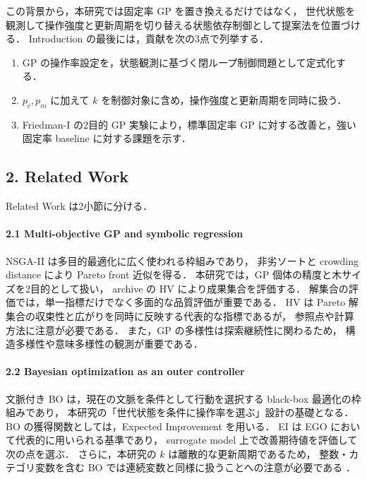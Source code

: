 \documentclass[a4paper,10pt,twocolumn]{ltjsarticle}
\newcommand{\HV}{\mathrm{HV}}
\newcommand{\pc}{p_c}
\newcommand{\pmut}{p_m}
\begin{document}
この背景から，本研究では固定率 GP を置き換えるだけではなく，
世代状態を観測して操作強度と更新周期を切り替える状態依存制御として提案法を位置づける．
Introduction の最後には，貢献を次の3点で列挙する．

\begin{enumerate}
  \item GP の操作率設定を，状態観測に基づく閉ループ制御問題として定式化する．
  \item \(\pc,\pmut\) に加えて \(k\) を制御対象に含め，操作強度と更新周期を同時に扱う．
  \item Friedman-I の2目的 GP 実験により，標準固定率 GP に対する改善と，強い固定率 baseline に対する課題を示す．
\end{enumerate}

\subsection{2. Related Work}

Related Work は2小節に分ける．

\paragraph{2.1 Multi-objective GP and symbolic regression}
NSGA-II は多目的最適化に広く使われる枠組みであり，
非劣ソートと crowding distance により Pareto front 近似を得る\cite{verma2021}．
本研究では，GP 個体の精度と木サイズを2目的として扱い，
archive の \(\HV\) により成果集合を評価する．
解集合の評価では，単一指標だけでなく多面的な品質評価が重要である\cite{li2019}．
\(\HV\) は Pareto 解集合の収束性と広がりを同時に反映する代表的な指標であるが，
参照点や計算方法に注意が必要である\cite{guerreiro2021}．
また，GP の多様性は探索継続性に関わるため，
構造多様性や意味多様性の観測が重要である\cite{burlacu2024}．

\paragraph{2.2 Bayesian optimization as an outer controller}
文脈付き BO は，現在の文脈を条件として行動を選択する black-box 最適化の枠組みであり，
本研究の「世代状態を条件に操作率を選ぶ」設計の基礎となる\cite{krause2011}．
BO の獲得関数としては，Expected Improvement を用いる．
EI は EGO において代表的に用いられる基準であり，
surrogate model 上で改善期待値を評価して次の点を選ぶ\cite{jones1998}．
さらに，本研究の \(k\) は離散的な更新周期であるため，
整数・カテゴリ変数を含む BO では連続変数と同様に扱うことへの注意が必要である
\cite{garrido2020}．
\end{document}
